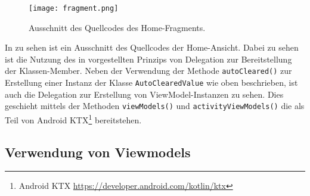 \begin{figure}[H]
    \texttt{[image: fragment.png]}
    \caption{Ausschnitt des Quellcodes des Home-Fragments.}\label{fig:fragment}
\end{figure}

\newpage

In  zu sehen ist ein Ausschnitt des Quellcodes der Home-Ansicht. Dabei zu sehen ist die Nutzung des in  vorgestellten Prinzips von Delegation zur Bereitstellung der Klassen-Member. Neben der Verwendung der Methode \texttt{autoCleared()} zur Erstellung einer Instanz der Klasse \texttt{AutoClearedValue} wie oben beschrieben, ist auch die Delegation zur Erstellung von ViewModel-Instanzen zu sehen. Dies geschieht mittels der Methoden \texttt{viewModels()} und \texttt{activityViewModels()} die als Teil von Android KTX\footnote{Android KTX \url{https://developer.android.com/kotlin/ktx}} bereitstehen.

\subsection{Verwendung von Viewmodels}\label{sub:viewmodel_usage}

